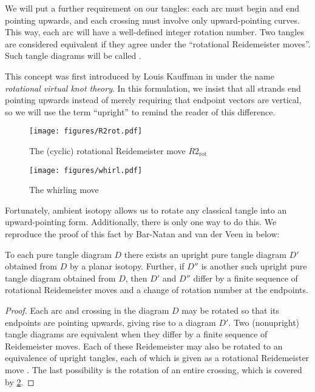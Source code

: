 \begin{definition}
        We will put a further requirement on our tangles: each arc must begin and end
        pointing upwards, and each crossing must involve only upward-pointing curves.
        This way, each arc will have a well-defined integer rotation number.
        Two tangles are considered equivalent if they agree under the
        \enquote{rotational Reidemeister moves}. Such tangle diagrams will be
        called .
\end{definition}
\begin{remark}
        This concept was first introduced by Louis Kauffman in \cite{LK} under
        the name \emph{rotational virtual knot theory}. In this formulation, we
        insist that all strands end pointing upwards instead of merely requiring
        that endpoint vectors are vertical, so we will use the term
        \enquote{upright} to remind the reader of this difference.
\end{remark}
\begin{figure}[h]
        \centering
        \texttt{[image: figures/R2rot.pdf]}
        \caption{The (cyclic) rotational Reidemeister move $R2_{\text{rot}}$}
        \label{fig:R2rot}
\end{figure}
\begin{figure}[h]
        \centering
        \texttt{[image: figures/whirl.pdf]}
        \caption{The whirling move}
        \label{fig:whirl}
\end{figure}

Fortunately, ambient isotopy allows us to rotate any classical tangle into an
upward-pointing form. Additionally, there is only one way to do this. We
reproduce the proof of this fact by Bar-Natan and van der Veen in \cite{BV}
below:

\begin{lemma}
        To each pure tangle diagram $D$ there exists an upright pure tangle
        diagram $D'$ obtained from $D$ by a planar isotopy. Further, if $D''$ is
        another such upright pure tangle diagram obtained from $D$, then $D'$
        and $D''$ differ by a finite sequence of rotational Reidemeister moves
        and a change of rotation number at the endpoints.
\end{lemma}
\begin{proof}
        Each arc and crossing in the diagram $D$ may be rotated so that its
        endpoints are pointing upwards, giving rise to a diagram $D'$. Two
        (nonupright) tangle diagrams are equivalent when they differ by a finite
        sequence of Reidemeister moves. Each of these Reidemeister may also be
        rotated to an equivalence of upright tangles, each of which is given as
        a rotational Reidemeister move . The
        last possibility is the rotation of an entire crossing, which is covered
        by \cref{fig:whirl}.
\end{proof}

